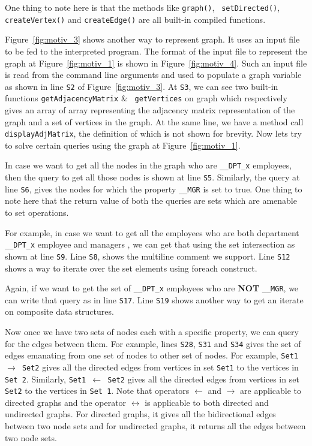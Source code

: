 \begin{example}
{  One thing to note here is that the methods like {\tt graph()}, {\tt 
    setDirected()}, {\tt createVertex()} and {\tt createEdge()} are all built-in 
    compiled functions. 

  
  
  Figure~\ref{fig:motiv_3} shows another way to represent graph.  
  It uses an input file to be fed to
  the interpreted program. The format of the input file to represent the graph 
  at Figure~\ref{fig:motiv_1} is shown in 
  Figure~\ref{fig:motiv_4}. Such an input file is read from the command line 
  arguments and 
  used to populate a graph variable as 
  shown in line {\tt S2} of Figure~\ref{fig:motiv_3}. At {\tt S3}, 
       we can see two built-in functions {\tt getAdjacencyMatrix} \& {\tt 
         getVertices} on graph
  which respectively gives an array of array representing the adjacency matrix 
  representation of the graph and a set of vertices in the graph. At the same 
  line, we have a method call {\tt displayAdjMatrix}, the definition of which is not 
    shown for brevity. Now lets try to solve certain queries using the graph at 
    Figure~\ref{fig:motiv_1}.

  In case we want to get all the nodes in the graph who are {\tt \_\_DPT\_x} 
  employees, then
  the query to get all those nodes is shown at line {\tt S5}. Similarly, the query at 
  line {\tt S6}, gives
  the nodes for which the property {\tt \_\_MGR} is set to true.  One thing to 
  note here that the return value of both the queries are sets which are 
  amenable to set operations.

  For example, in case we want to get all the employees who are both department 
  {\tt \_\_DPT\_x} employee and managers
  , we can get that using the set intersection as shown at line {\tt S9}. Line 
  {\tt S8}, shows the multiline comment we support. Line {\tt S12} shows a way to 
  iterate over the set elements using foreach construct.

  Again, if we want to get the  set of {\tt \_\_DPT\_x} employees who are 
  \textbf{NOT} {\tt \_\_MGR},
  we can write that query as in line {\tt S17}. Line {\tt S19} shows another way
    to get an iterate on composite data structures. 

 Now once we have two sets of nodes each with a specific property, we can query 
 for the edges between them.
 For example, lines {\tt S28}, {\tt S31} and {\tt S34} gives the set of edges 
   emanating from one set of nodes
 to other set of nodes. For example, {\tt Set1 $\rightarrow$ Set2} gives all the 
 directed edges from vertices in set {\tt Set1} to the vertices in {\tt Set 2}. 
 Similarly, {\tt Set1 $\leftarrow$ Set2} gives all the directed edges from 
 vertices in set {\tt Set2} to the vertices in {\tt Set 1}.
  Note that operators $\leftarrow$ and $\rightarrow$ are 
 applicable to directed graphs
 and the operator $\leftrightarrow$ is applicable to both directed and 
 undirected graphs. For directed graphs,
 it gives all the bidirectional edges between two node sets and for undirected 
   graphs, it returns all the edges between
   two node sets.
    \hfill\psframebox{}}
\end{example}


